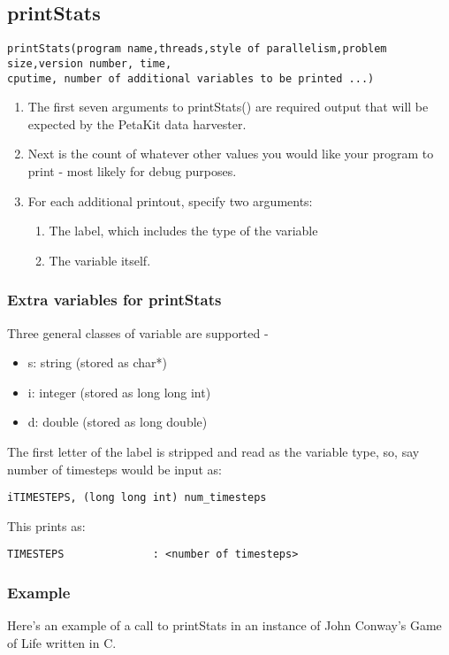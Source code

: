 \documentclass[12pt]{article}
\begin{document}
\subsection {printStats}
\begin{verbatim}printStats(program name,threads,style of parallelism,problem size,version number, time,
cputime, number of additional variables to be printed ...) \end{verbatim}
\begin{enumerate}
	\item The first seven arguments to printStats() are required output that will be expected by the PetaKit data harvester.
	\item Next is the count of whatever other values you would like your program to print - most likely for debug purposes.
	\item For each additional printout, specify two arguments:
	\begin{enumerate}
		\item The label, which includes the type of the variable
		\item The variable itself.
	\end{enumerate}
\end{enumerate} 
\subsubsection{Extra variables for printStats}
Three general classes of variable are supported -
\begin{itemize}
    \item s: string (stored as char*)
    \item i: integer (stored as long long int)
    \item d: double (stored as long double) 
\end{itemize}

The first letter of the label is stripped and read as the variable type, so, say number of timesteps would be input as:

\begin{verbatim}
iTIMESTEPS, (long long int) num_timesteps
\end{verbatim}

This prints as:

\begin{verbatim}
TIMESTEPS              : <number of timesteps>
\end{verbatim}
\subsubsection{Example}
Here's an example of a call to printStats in an instance of John Conway's Game of Life written in C.
\end{document}
